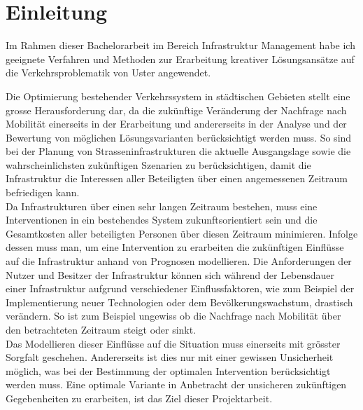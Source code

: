 %
%            
%
%
%

\chapter{Einleitung}
\label{chap:Einleitung}

Im Rahmen dieser Bachelorarbeit im Bereich Infrastruktur Management habe ich geeignete Verfahren und Methoden zur Erarbeitung kreativer Lösungsansätze auf die Verkehrsproblematik von Uster angewendet.

Die Optimierung bestehender Verkehrssystem in städtischen Gebieten stellt eine grosse Herausforderung dar, da die zukünftige Veränderung der Nachfrage nach Mobilität einerseits in der Erarbeitung und andererseits in der Analyse und der Bewertung von möglichen Lösungsvarianten berücksichtigt werden muss. So sind bei der Planung von Strasseninfrastrukturen die aktuelle Ausgangslage sowie die wahrscheinlichsten zukünftigen Szenarien zu berücksichtigen, damit die Infrastruktur die Interessen aller Beteiligten über einen angemessenen Zeitraum befriedigen kann. \\
Da Infrastrukturen über einen sehr langen Zeitraum bestehen, muss eine Interventionen in ein bestehendes System zukunftsorientiert sein und die Gesamtkosten aller beteiligten Personen über diesen Zeitraum minimieren. Infolge dessen muss man, um eine Intervention zu erarbeiten die zukünftigen Einflüsse auf die Infrastruktur anhand von Prognosen modellieren. Die Anforderungen der Nutzer und Besitzer der Infrastruktur können sich während der Lebensdauer einer Infrastruktur aufgrund verschiedener Einflussfaktoren, wie zum Beispiel der Implementierung neuer Technologien oder dem Bevölkerungswachstum, drastisch verändern. So ist zum Beispiel ungewiss ob die Nachfrage nach Mobilität über den betrachteten Zeitraum steigt oder sinkt. \\
Das Modellieren dieser Einflüsse auf die Situation muss einerseits mit grösster Sorgfalt geschehen. Andererseits ist dies nur mit einer gewissen Unsicherheit möglich, was bei der Bestimmung der optimalen Intervention berücksichtigt werden muss. Eine optimale Variante in Anbetracht der unsicheren zukünftigen Gegebenheiten zu erarbeiten, ist das Ziel dieser Projektarbeit. 

